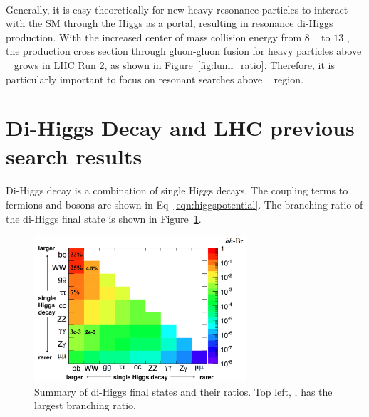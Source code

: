 \paragraph{}
Generally, it is easy theoretically for new heavy resonance particles to interact with the SM through the Higgs as a portal, resulting in resonance di-Higgs production. With the increased center of mass collision energy from $8$ \TeV~ to $13$ \TeV, the production cross section through gluon-gluon fusion for heavy particles above \TeV~ grows in LHC Run 2, as shown in Figure~\ref{fig:lumi_ratio}. Therefore, it is particularly important to focus on resonant searches above \TeV~ region.


\section{Di-Higgs Decay and LHC previous search results}
\paragraph{}
Di-Higgs decay is a combination of single Higgs decays. The coupling terms to fermions and bosons are shown in Eq~\ref{eqn:higgspotential}. The branching ratio of the di-Higgs final state is shown in Figure~\ref{fig:HH_BR}.

\begin{figure}[h!]
  \centering
  \includegraphics[width=0.7\textwidth]{figures/theory/HH_BR}
  \caption{Summary of di-Higgs final states and their ratios. Top left, \bbbb, has the largest branching ratio.}
  \label{fig:HH_BR}
\end{figure}

